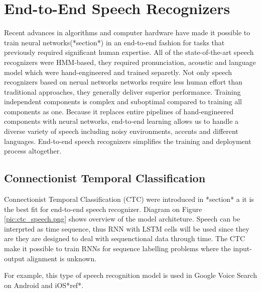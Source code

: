 \section{End-to-End Speech Recognizers}

Recent advances in algorithms and computer hardware have made it possible to train neural networks(*section*) in an end-to-end fashion for tasks that previously required significant human expertise.
All of the state-of-the-art speech recognizers were HMM-based, they required pronunciation, acoustic and language model which were hand-engineered and trained separetly.
Not only speech recognizers based on nerual networks networks require less human effort than traditional approaches, they generally deliver superior performance.
Training independent components is complex and suboptimal compared to training all components as one.
Because it replaces entire pipelines of hand-engineered components with neural networks, end-to-end learning allows us to handle a diverse variety of speech including noisy environments, accents and different languages.
End-to-end speech recognizers simplifies the training and deployment process altogether.

\subsection{Connectionist Temporal Classification}

Connectionist Temporal Classification (CTC) were introduced in *section* a it is the best fit for end-to-end speech recognizer.
Diagram on Figure \ref{pic:ctc_speech.png} shows overview of the model architeture.
Speech can be interprted as time sequence, thus RNN with LSTM cells will be used since they are they are designed to deal with sequenctional data through time.
The CTC make it possible to train RNNs for sequence labelling problems where the input-output alignment is unknown.


For example, this type of speech recognition model is used in Google Voice Search on Android and iOS*ref*.


